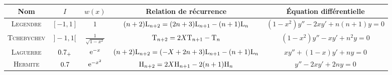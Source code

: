 \begin{figure*}[h!]
    \begingroup
    \renewcommand{\arraystretch}{1.2} %
    \begin{tabular}{|c|c|c|c|c|}
        \hline
        Nom & $I$ & $w(x)$ & Relation de récurrence & Équation différentielle\\
        \hline \hline
        \textsc{Legendre} & $[-1, 1]$ & $1$ & $(n+2) \mathrm{L}_{n+2} = (2n+3) \mathrm{L}_{n+1} - (n+1)\mathrm{L}_n$ & $(1-x^2) y'' - 2xy' + n(n+1) y = 0$\\
        \hline
        \textsc{Tchebychev} & $]-1, 1[$ & $\frac{1}{\sqrt{1-x^2}}$ & $\mathrm{T}_{n+2} = 2X \mathrm{T}_{n+1} - \mathrm{T}_n$ & $(1-x^2)y'' - xy' + n^2y = 0$ \\
        \hline
        \textsc{Laguerre} & $0.7_+$ & $\mathrm{e}^{-x}$ & $(n+2) \mathrm{L}_{n+2} = (-X+2n+3) \mathrm{L}_{n+1} - (n+1) \mathrm{L}_n$ & $xy'' + (1-x)y' + ny = 0$\\
        \hline
        \textsc{Hermite} & $0.7$ & $\mathrm{e}^{-x^2}$ & $\mathrm{H}_{n+2} = 2X \mathrm{H}_{n+1} - 2(n+1) \mathrm{H}_n$ & $y'' - 2xy' + 2ny = 0$\\
        \hline
    \end{tabular}
    \endgroup
\end{figure*}

